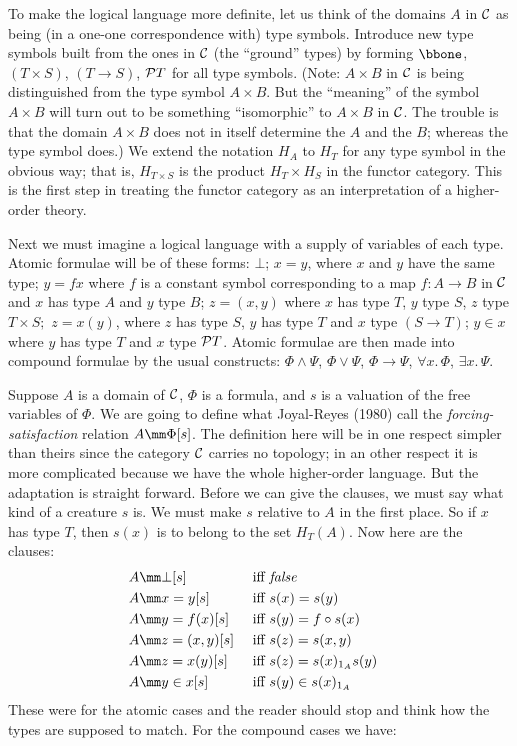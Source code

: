 To make the logical language more definite, let us think of the domains $A$ in $\C$ as
being (in a one-one correspondence with) type symbols. Introduce new type symbols built
from the ones in $\C$ (the ``ground'' types) by forming $\bbone$, $(T \times S)$, $(T\to
S)$, $\P T$ for all type symbols. (Note: $A \times B$ in $\C$ is being distinguished from
the type symbol $A \times B$. But the ``meaning'' of the symbol $A\times B$ will turn out
to be something ``isomorphic'' to $A\times B$ in $\C$. The trouble is that the domain $A
\times B$ does not in itself determine the $A$ and the $B$; whereas the type symbol does.)
We extend the notation $H_A$ to $H_T$ for any type symbol in the obvious way; that is,
$H_{T \times S}$ is the product $H_T \times H_S$ in the functor category. This is the
first step in treating the functor category as an interpretation of a higher-order theory.

Next we must imagine a logical language with a supply of variables of each type. Atomic
formulae will be of these forms: $\bot$; $x = y$, where $x$ and $y$ have the same type; $y
= f x$ where $f$ is a constant symbol corresponding to a map $f: A \to B$ in $\C$ and $x$
has type $A$ and $y$ type $B$; $z = (x,y)$ where $x$ has type $T$, $y$ type $S$, $z$ type
$T \times S;$ $z = x(y)$, where $z$ has type $S$, $y$ has type $T$ and $x$ type $(S \to
T)$; $y \in x$ where $y$ has type $T$ and $x$ type $\P T$. Atomic formulae are then made
into compound formulae by the usual constructs: $\Phi \land \Psi$, $\Phi \lor \Psi$, $\Phi
\to \Psi$, $\forall x. \, \Phi$, $\exists x. \, \Psi$.


Suppose $A$ is a domain of $\C$, $\Phi$ is a formula, and $s$ is a valuation of the free
variables of $\Phi$. We are going to define what Joyal-Reyes (1980) call the {\it
forcing-satisfaction} relation $A \mm \Phi[s]$. The definition here will be in one respect
simpler than theirs since the category $\C$ carries no topology; in an other respect it is
more complicated because we have the whole higher-order language. But the adaptation is
straight forward. Before we can give the clauses, we must say what kind of a creature $s$ is.
We must make $s$ relative to $A$ in the first place. So if $x$ has type $T$, then $s(x)$
is to belong to the set $H_T(A)$. Now here are the clauses:
\begin{align*}
  A & \mm \bot [s] & {\textrm{ iff }} & {\mathit { false }} &\\
  A & \mm x = y  [s] & {\textrm{ iff }} & s(x) = s(y) &\\
  A & \mm y = f(x) [s] & {\textrm{ iff }} & s(y) = f \comp s(x) &\\
  A & \mm z = (x,y) [s] & {\textrm{ iff }} & s(z) = s(x,y) &\\
  A & \mm z = x(y) [s] & {\textrm{ iff }} & s(z) = s(x)_{\id_A} s(y) &\\
  A & \mm y \in x [s] & {\textrm{ iff }} & s(y) \in s(x)_{\id_A} &
\end{align*}
These were for the atomic cases and the reader should stop and think how the types are
supposed to match. For the compound cases we have:

